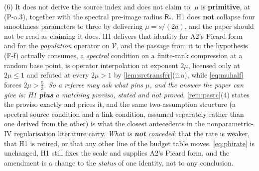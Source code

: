 \begin{remark}
(6) It does not derive the source index and does not claim to. $\mu$ is
\textbf{primitive}, at (P-a.3), together with the spectral pre-image radius $\mathsf R_\ast$. H1
does \textbf{not} collapse four smoothness parameters to three by
delivering $\mu=s/(2a)$, and the paper should not be read as claiming it does.
H1 delivers that identity for A2's Picard form and for the
\emph{population} operator on $\mathcal V$, and the passage from it to the hypothesis (F-f) actually
consumes, a \emph{spectral} condition on a finite-rank compression at a random base point, is
operator interpolation at exponent $2\mu$, licensed only at $2\mu\le1$ and refuted at every $2\mu>1$ by
\cref{lem:srctransfer}(ii.a), while \eqref{eq:muhalf} forces $2\mu>\tfrac53$. \emph{So a referee may ask
what pins $\mu$, and the answer the paper can give is: H1 \textbf{plus} a matching proviso, stated and
not proved}, \cref{rem:pasrc}(4) states the proviso exactly and prices it, and the same two-assumption
structure (a spectral source condition and a link condition, assumed separately rather than one derived
from the other) is what the closest antecedents in the nonparametric-IV regularisation literature carry.
\emph{What is \textbf{not} conceded}: that the rate is weaker, that H1 is retired, or that any other line
of the budget table moves. \eqref{eq:phirate} is unchanged, H1 still fixes the scale and supplies A2's
Picard form, and the amendment is a change to the \emph{status} of one identity, not to any conclusion.


\end{remark}
